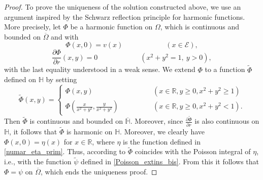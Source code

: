 \documentclass{amsart} %
\numberwithin{equation}{section}
\theoremstyle{definition}
\begin{document}
\begin{proof}
To prove the uniqueness of the solution  constructed above, 
we use an argument inspired by the Schwarz reflection principle for harmonic functions.
More precisely, let $\Phi$ be a harmonic function on $\Omega$, which is continuous and bounded on $\overline\Omega$ and with
$$
\Phi(x,0)=v(x) \qquad\qquad\qquad(x\in \mathcal{E}),
$$
$$
\frac{\partial \Phi}{\partial r}(x,y)=0 \qquad\qquad\qquad(x^2+y^2=1,\ y>0),
$$
with the last equality understood in a weak sense.
We extend $\Phi$ to a function $\tilde\Phi$ defined on $\mathbb{H}$ by setting
  \begin{equation*}
\tilde\Phi(x,y)=\begin{cases}
\Phi(x,y) & \qquad\qquad(x\in \mathbb{R},y \geqslant0,x^2+y^2\geqslant 1)\\
\Phi\left(\frac{x}{x^2+y^2},\frac{y}{x^2+y^2}\right) & \qquad\qquad(x\in \mathbb{R},y\geqslant 0,x^2+y^2<1).
\end{cases}
\end{equation*}
Then $\tilde\Phi$ is continuous and bounded on $\overline{\mathbb{H}}$. Moreover, since $\frac{\partial\tilde\Phi}{\partial r}$ 
is also continuous on $\mathbb{H}$, it follows that $\tilde\Phi$ is harmonic on $\mathbb{H}$. Moreover, we clearly have $\Phi(x,0)=\eta(x)$
for $x\in\mathbb{R}$,
where $\eta$ is the function defined in \eqref{numar_eta_prim}. Thus, according to \cite[Theorem 7.5]{axler2013harmonic}
$\tilde\Phi$ coincides with the Poisson integral of $\eta$, i.e., with the function $\tilde\psi$ defined in \eqref{Poisson_extins_bis}.
From this it follows that $\Phi=\psi$ on $\overline\Omega$, which ends the uniqueness proof.


\end{proof}
\end{document}
